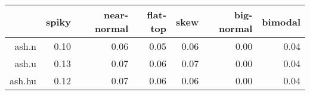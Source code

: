 \begin{tabular}{rrrrrrr}
  \toprule  & spiky & near-normal & flat-top & skew & big-normal & bimodal \\ 
  \midrule ash.n & 0.10 & 0.06 & 0.05 & 0.06 & 0.00 & 0.04 \\ 
  ash.u & 0.13 & 0.07 & 0.06 & 0.07 & 0.00 & 0.04 \\ 
  ash.hu & 0.12 & 0.07 & 0.06 & 0.06 & 0.00 & 0.04 \\ 
   \bottomrule \end{tabular}

